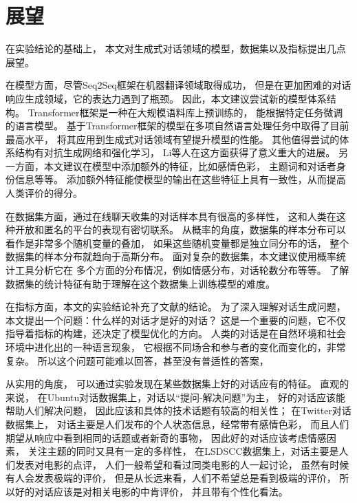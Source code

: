 \section*{展望}\label{sec:future_work}
在实验结论的基础上，
本文对生成式对话领域的模型，数据集以及指标提出几点展望。

在模型方面，尽管Seq2Seq框架在机器翻译领域取得成功，
但是在更加困难的对话响应生成领域，它的表达力遇到了瓶颈。
因此，本文建议尝试新的模型体系结构。
Transformer框架是一种在大规模语料库上预训练的，
能根据特定任务微调的语言模型。
基于Transformer框架的模型在多项自然语言处理任务中取得了目前最高水平，
将其应用到生成式对话领域有望提升模型的性能。
其他值得尝试的体系结构有对抗生成网络和强化学习，
Li等人在这方面获得了意义重大的进展。
另一方面，本文建议在模型中添加额外的特征，比如感情色彩，
主题词和对话者身份信息等等。
添加额外特征能使模型的输出在这些特征上具有一致性，从而提高人类评价的得分。

在数据集方面，通过在线聊天收集的对话样本具有很高的多样性，
这和人类在这种开放和匿名的平台的表现有密切联系。
从概率的角度，数据集的样本分布可以看作是非常多个随机变量的叠加，
如果这些随机变量都是独立同分布的话，
整个数据集的样本分布就趋向于高斯分布。
面对复杂的数据集，本文建议使用概率统计工具分析它在
多个方面的分布情况，例如情感分布，对话轮数分布等等。
了解数据集的统计特征有助于理解在这个数据集上训练模型的难度。

在指标方面，本文的实验结论补充了文献\cite{HowNot}的结论。
为了深入理解对话生成问题，本文提出一个问题：什么样的对话才是好的对话？
这是一个重要的问题，它不仅指导着指标的构建，还决定了模型优化的方向。
人类的对话是在自然环境和社会环境中进化出的一种语言现象，
它根据不同场合和参与者的变化而变化的，非常复杂。
所以这个问题可能难以回答，甚至没有普适性的答案，

从实用的角度，
可以通过实验发现在某些数据集上好的对话应有的特征。
直观的来说，
在Ubuntu对话数据集上，对话以“提问-解决问题”为主，
好的对话应该能帮助人们解决问题，
因此应该和具体的技术话题有较高的相关性；
在Twitter对话数据集上，
对话主要是人们发布的个人状态信息，经常带有感情色彩，
而且人们期望从响应中看到相同的话题或者新奇的事物，
因此好的对话应该考虑情感因素，
关注主题的同时又具有一定的多样性，
在LSDSCC数据集上，对话主要是人们发表对电影的点评，
人们一般希望和看过同类电影的人一起讨论，
虽然有时候有人会发表极端的评价，
但是从长远来看，人们不希望总是看到极端的评价，
所以好的对话应该是对相关电影的中肯评价，
并且带有个性化看法。

